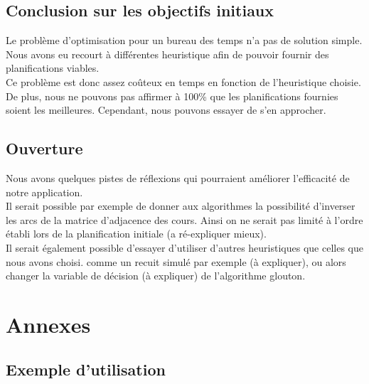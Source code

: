\documentclass[a4paper,11pt]{article}
\begin{document}
	\subsection{Conclusion sur les objectifs initiaux}
		Le problème d'optimisation pour un bureau des temps n'a pas de solution simple. Nous avons eu recourt à différentes heuristique afin de pouvoir fournir des planifications viables.\\
		Ce problème est donc assez coûteux en temps en fonction de l'heuristique choisie. De plus, nous ne pouvons pas affirmer à 100\% que les planifications fournies soient les meilleures. Cependant, nous pouvons essayer de s'en approcher.

	\subsection{Ouverture}
		Nous avons quelques pistes de réflexions qui pourraient améliorer l'efficacité de notre application.\\
		Il serait possible par exemple de donner aux algorithmes la possibilité d'inverser les arcs de la matrice d'adjacence des cours. Ainsi on ne serait pas limité à l'ordre établi lors de la planification initiale (a ré-expliquer mieux).\\
		Il serait également possible d'essayer d'utiliser d'autres heuristiques que celles que nous avons choisi. comme un recuit simulé par exemple (à expliquer), ou alors changer la variable de décision (à expliquer) de l'algorithme glouton.


\newpage
\section{Annexes}
	\subsection{Exemple d'utilisation}
\end{document}
